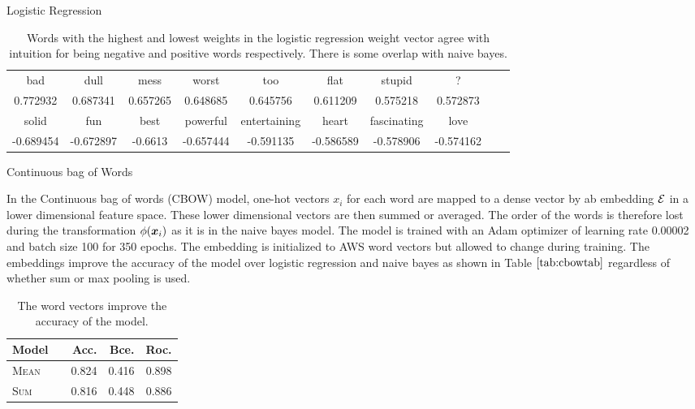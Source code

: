 \documentclass[11pt]{article}
\begin{document}
\begin{subsection}{Logistic Regression}
\begin{table}[h]
\centering
\begin{tabular}{cccccccccc}
 \midrule
bad & dull & mess  & worst & too &flat & stupid&? \\
   0.772932 & 0.687341& 0.657265 &0.648685&0.645756&0.611209 & 0.575218 &  0.572873 \\
 \bottomrule
 \bottomrule
 solid  & fun& best & powerful & entertaining & heart & fascinating & love \\
  -0.689454 & -0.672897& -0.6613 & -0.657444 & -0.591135 &  -0.586589 &-0.578906 & -0.574162 \\
 \bottomrule
\end{tabular}
\caption{\label{tab:logwords} Words with the highest and lowest weights in the logistic regression weight vector agree with intuition for being negative and positive words respectively. There is some overlap with naive bayes.}
\end{table}

\end{subsection}




\begin{subsection}{Continuous bag of Words}

In the Continuous bag of words (CBOW) model, one-hot vectors $x_i$ for each word are mapped to a dense vector by ab embedding $\mathcal{E}$ in a lower dimensional feature space. These lower dimensional vectors are then summed or averaged. The order of the words is therefore lost during the transformation $\phi(\boldsymbol{x}_i)$ as it is in the naive bayes model. The model is trained with an Adam optimizer of learning rate 0.00002 and batch size 100 for 350 epochs. The embedding is initialized to AWS word vectors but allowed to change during training. The embeddings improve the accuracy of the model over logistic regression and naive bayes as shown in Table $\ref{tab:cbowtab}$ regardless of whether sum or max pooling is used.

\begin{table}[h]
\centering
\begin{tabular}{llrrr}
 \toprule
 Model &  & Acc. & Bce. & Roc.\\
 \midrule
 \textsc{Mean} & & 0.824 & 0.416 & 0.898\\
 \textsc{Sum} & & 0.816  & 0.448 & 0.886\\
 \bottomrule
\end{tabular}
\caption{\label{tab:cbowtab} The word vectors improve the accuracy of the model.}
\end{table}

\end{subsection}
\end{document}
